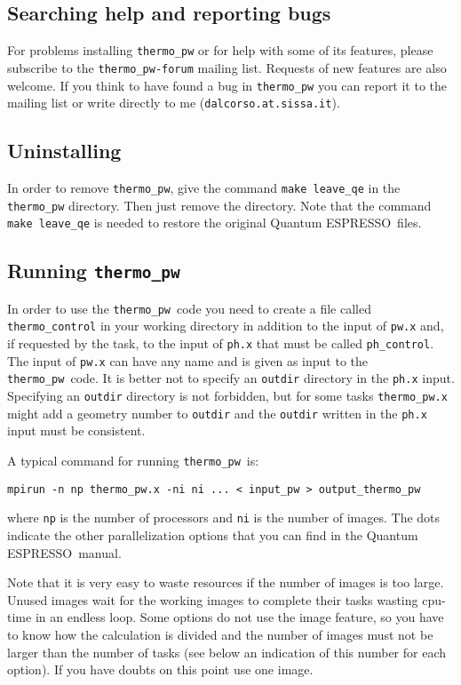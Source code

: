 \documentclass[12pt,a4paper]{article}
\def\qe{{\sc Quantum ESPRESSO}}
\def\thermo{\texttt{thermo\_pw}}
\begin{document}
\subsection{\color{web-blue}Searching help and reporting bugs}
For problems installing \texttt{thermo\_pw} or for help
with some of its features, please subscribe to the \texttt{thermo\_pw-forum}
mailing list. Requests of new features are also welcome. If you think to have found a bug 
in \texttt{thermo\_pw} you can report it to the mailing list or 
write directly to me (\texttt{dalcorso.at.sissa.it}).

\subsection{\color{web-blue}Uninstalling}

In order to remove \thermo, give the command \texttt{make leave\_qe} in the
\texttt{thermo\_pw} directory. Then just remove the directory. Note that 
the command \texttt{make leave\_qe} is needed to restore the original \qe\ files.

\subsection{\color{web-blue}Running \thermo}

In order to use the \thermo\ code you need to create a file called
\texttt{thermo\_control} in your working directory in addition to 
the input of \texttt{pw.x} and, if requested by the task, to the
input of \texttt{ph.x} that must be called \texttt{ph\_control}.
The input of \texttt{pw.x} can have any name and is given as input to
the \thermo\ code. It is better not to specify an \texttt{outdir} 
directory in the \texttt{ph.x} input. Specifying an \texttt{outdir}
directory is not forbidden, but for some tasks \texttt{thermo\_pw.x} 
might add a geometry number to \texttt{outdir} and the
\texttt{outdir} written in the \texttt{ph.x} input must be consistent.

A typical command for running \thermo\ is:
\begin{verbatim}
mpirun -n np thermo_pw.x -ni ni ... < input_pw > output_thermo_pw
\end{verbatim}
where \texttt{np} is the number of processors and \texttt{ni} is the number 
of images. The dots indicate the other parallelization options that
you can find in the \qe\ manual.

Note that it is very easy to waste resources if the number of 
images is too large. Unused images wait for the working images to complete
their tasks wasting cpu-time in an endless loop. 
Some options 
do not use the image feature, so you have to know how the calculation 
is divided and the number of images must not
be larger than the number of tasks (see below an indication of this number
for each option). If you have doubts on this point use one image.
\end{document}
